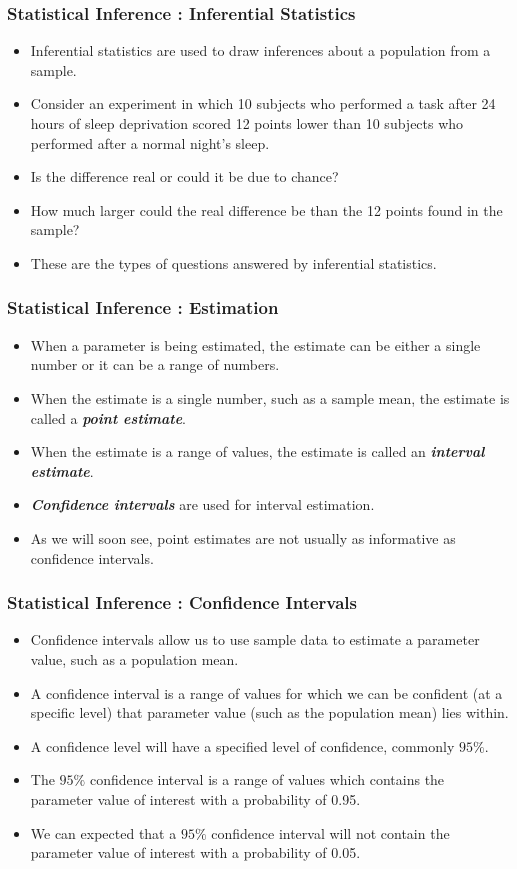 \begin{frame}
\frametitle{Statistical Inference : Inferential Statistics}
\begin{itemize}
\item Inferential statistics are used to draw inferences about a population from a sample.
\item Consider an experiment in which 10 subjects who performed a task after 24 hours of sleep
deprivation scored 12 points lower than 10 subjects who performed after a normal night's sleep.
\item Is the difference real or could it be due to chance?
\item How much larger could the real difference be than the 12 points found in the sample?
\item These are the types of questions answered by inferential statistics.
\end{itemize}
\end{frame}


\begin{frame}
\frametitle{Statistical Inference : Estimation}
\begin{itemize}
\item When a parameter is being estimated, the estimate can be either a single number or it can be a range of numbers.
\item When the estimate is a single number, such as a sample mean, the estimate is called a \textbf{\emph{point estimate}}.
\item When the estimate is a range of values, the estimate is called an \textbf{\emph{interval estimate}}.
\item \textbf{\emph{Confidence intervals}} are used for interval estimation.
\item As we will soon see, point estimates are not usually as informative as confidence intervals.
\end{itemize}
\end{frame}


\begin{frame}
\frametitle{Statistical Inference : Confidence Intervals}
\begin{itemize}
\item Confidence intervals allow us to use sample data to estimate a parameter value, such as a population mean.
\item A confidence interval is a range of values for which we can be confident (at a specific level) that parameter value (such as the population mean)  lies within.
\item A confidence level will have a specified level of confidence, commonly $95\%$.
\item The $95\%$ confidence interval is a range of values which contains the parameter value of interest with a probability of 0.95.
\item We can expected that a $95\%$ confidence interval will not contain the parameter value of interest with a probability of 0.05.
\end{itemize}
\end{frame}


